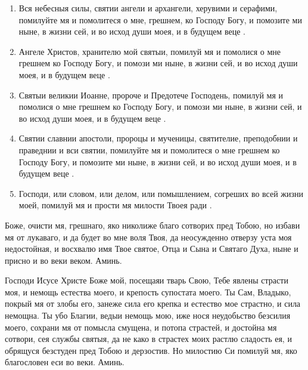 \begin{mymulticols}
\begin{enumerate}
\item Вся небесныя силы, святии ангели и архангели, херувими и серафими, помилуйте мя и помолитеся о мне, грешнем, ко Господу Богу, и помозите ми ныне, в жизни сей, и во исход души моея, и в будущем веце .

\item Ангеле Христов, хранителю мой святыи, помилуй мя и помолися о мне грешнем ко Господу Богу, и помози ми ныне, в жизни сей, и во исход души моея, и в будущем веце .

\item Святыи великии Иоанне, пророче и Предотече Господень, помилуй мя и помолися о мне грешнем ко Господу Богу, и помози ми ныне, в жизни сей, и во исход души моея, и в будущем веце .

\item Святии славнии апостоли, пророцы и мученицы, святителие, преподобнии и праведнии и вси святии, помилуйте мя и помолитеся о мне грешнем ко Господу Богу, и помозите ми ныне, в жизни сей, и во исход души моея, и в будущем веце .

\item Господи, или словом, или делом, или помышлением, согреших во всей жизни моей, помилуй мя и прости мя милости Твоея ради .

\end{enumerate}


Боже, очисти мя, грешнаго, яко николиже благо сотворих пред Тобою, но избави мя от лукаваго, и да будет во мне воля Твоя, да неосужденно отверзу уста моя недостойная, и восхвалю имя Твое святое, Отца и Сына и Святаго Духа, ныне и присно и во веки веком. Аминь.



Господи Исусе Христе Боже мой, посещаяи тварь Свою, Тебе явлены страсти моя, и немощь естества моего, и крепость супостата моего. Ты Сам, Владыко, покрый мя от злобы его, занеже сила его крепка и естество мое страстно, и сила немощна. Ты убо Благии, ведыи немощь мою, иже нося неудобьство безсилия моего, сохрани мя от помысла смущена, и потопа страстей, и достойна мя сотвори, сея службы святыя, да не како в страстех моих растлю сладость ея, и обрящуся безстуден пред Тобою и дерзостив. Но милостию Си помилуй мя, яко благословен еси во веки. Аминь.




\end{mymulticols}
